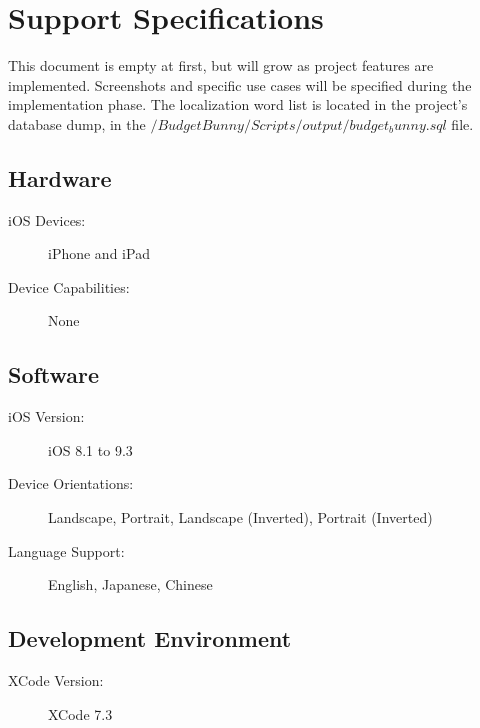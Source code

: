 \section{Support Specifications}

This document is empty at first, but will grow as project features are implemented.  
Screenshots and specific use cases will be specified during the implementation phase.
The localization word list is located in the project's database dump, in the $/BudgetBunny/Scripts/output/budget_bunny.sql$ file. 

\subsection{Hardware}
\begin{description}
\item[iOS Devices:] iPhone and iPad
\item[Device Capabilities:] None
\end{description}

\subsection{Software}
\begin{description}
\item[iOS Version:] iOS 8.1 to 9.3
\item[Device Orientations:] Landscape, Portrait, Landscape (Inverted), Portrait (Inverted)
\item[Language Support:] English, Japanese, Chinese
\end{description}

\subsection{Development Environment}
\begin{description}
\item[XCode Version:] XCode 7.3
\end{description}

